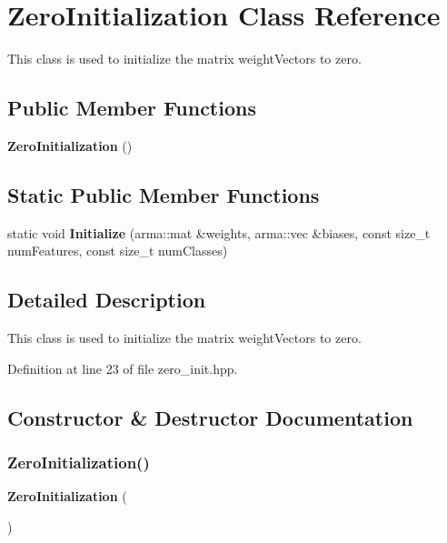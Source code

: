 \section{Zero\+Initialization Class Reference}
\label{classmlpack_1_1perceptron_1_1ZeroInitialization}


This class is used to initialize the matrix weight\+Vectors to zero.  


\subsection*{Public Member Functions}
\begin{DoxyCompactItemize}
\item 
\textbf{ Zero\+Initialization} ()
\end{DoxyCompactItemize}
\subsection*{Static Public Member Functions}
\begin{DoxyCompactItemize}
\item 
static void \textbf{ Initialize} (arma\+::mat \&weights, arma\+::vec \&biases, const size\+\_\+t num\+Features, const size\+\_\+t num\+Classes)
\end{DoxyCompactItemize}


\subsection{Detailed Description}
This class is used to initialize the matrix weight\+Vectors to zero. 

Definition at line 23 of file zero\+\_\+init.\+hpp.



\subsection{Constructor \& Destructor Documentation}
\mbox{\label{classmlpack_1_1perceptron_1_1ZeroInitialization_aa45075d91d201bc2464a540a2fe4dcb9}} 
\subsubsection{Zero\+Initialization()}
{\footnotesize\ttfamily \textbf{ Zero\+Initialization} (\begin{DoxyParamCaption}{ }\end{DoxyParamCaption})\hspace{0.3cm}{\ttfamily [inline]}}



